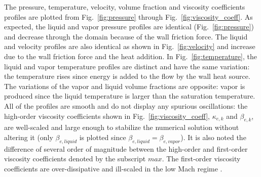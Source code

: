 \documentclass{anstrans}
\newcommand{\fig}[1]{Fig.~\ref{#1}}                      %
\begin{document}
The pressure, temperature, velocity, volume fraction and viscosity coefficients profiles are plotted from \fig{fig:pressure} through \fig{fig:viscosity_coeff}. As expected, the liquid and vapor pressure profiles are identical (\fig{fig:pressure}) and decrease through the domain because of the wall friction force. The liquid and velocity profiles are also identical as shown in \fig{fig:velocity} and increase due to the wall friction force and the heat addition. In \fig{fig:temperature}, the liquid and vapor temperature profiles are distinct and have  the same variation: the temperature rises since energy is added to the flow by the wall heat source. The variations of the vapor and liquid volume fractions are opposite: vapor is produced since the liquid temperature is larger than the saturation temperature. All of the profiles are smooth and do not display any spurious oscillations: the high-order viscosity coefficients shown in \fig{fig:viscosity_coeff}, $\kappa_{e,k}$ and $\beta_{e,k}$, are well-scaled and large enough to stabilize the numerical solution without altering it (only $\beta_{e,liquid}$ is plotted since $\beta_{e,liquid}=\beta_{e,vapor}$). It is also noted the difference of several order of magnitude between the high-order and first-order viscosity coefficients denoted by the subscript $max$. The first-order viscosity coefficients are over-dissipative and ill-scaled in the low Mach regime \cite{marco_inl_report}.
%
\end{document}
